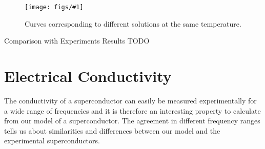 \documentclass[12pt]{report}
\newcommand{\fig}[3]{
\begin{figure}
\centering
\texttt{[image: figs/\#1]}
\caption{#2}
\end{figure}
}
\begin{document}
\fig{O2Tzeros}{Curves corresponding to different solutions at the same temperature.}
\subsection{Comparison with Experiments Results}
TODO
\section{Electrical Conductivity}
The conductivity of a superconductor can easily be measured experimentally for a wide range of frequencies and it is therefore an interesting property to calculate from our model of a superconductor. The agreement in different frequency ranges tells us about similarities and differences between our model and the experimental superconductors.\\
\end{document}
